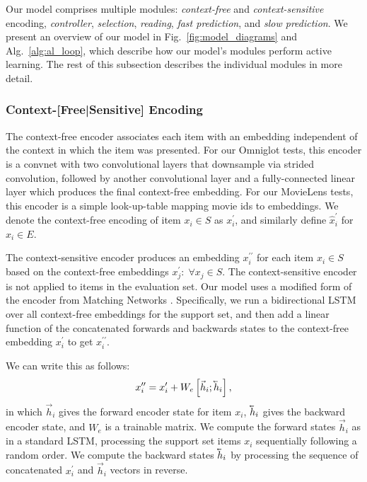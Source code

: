Our model comprises multiple modules: \emph{context-free} and \emph{context-sensitive} encoding, \emph{controller}, \emph{selection}, \emph{reading}, \emph{fast prediction}, and \emph{slow prediction}. We present an overview of our model in Fig.~\ref{fig:model_diagrams} and Alg.~\ref{alg:al_loop}, which describe how our model's modules perform active learning. The rest of this subsection describes the individual modules in more detail.



\subsubsection{Context-[Free|Sensitive] Encoding}
The context-free encoder associates each item with an embedding independent of the context in which the item was presented. For our Omniglot tests, this encoder is a convnet with two convolutional layers that downsample via strided convolution, followed by another convolutional layer and a fully-connected linear layer which produces the final context-free embedding. For our MovieLens tests, this encoder is a simple look-up-table mapping movie ids to embeddings. We denote the context-free encoding of item $x_i \in S$ as $x^{\prime}_i$, and similarly define $\hat{x}^{\prime}_i$ for $\hat{x}_i \in E$.

The context-sensitive encoder produces an embedding $x_i^{\prime\prime}$ for each item $x_i \in S$ based on the context-free embeddings $x_j^{\prime}: \; \forall x_j \in S$. The context-sensitive encoder is not applied to items in the evaluation set. Our model uses a modified form of the encoder from Matching Networks \cite{vinyals2016matching}. Specifically, we run a bidirectional LSTM \cite{hochreiter1997, Schuster1997} over all context-free embeddings for the support set, and then add a linear function of the concatenated forwards and backwards states to the context-free embedding $x_i^{\prime}$ to get $x_i^{\prime\prime}$.

We can write this as follows:
\begin{equation}
x_i^{\prime\prime} = x_i^{\prime} + W_{e} \left[ \vec{h}_i; \cev{h}_i \right],
\end{equation}
in which $\vec{h}_i$ gives the forward encoder state for item $x_i$, $\cev{h}_i$ gives the backward encoder state, and $W_{e}$ is a trainable matrix. We compute the forward states $\vec{h}_i$ as in a standard LSTM, processing the support set items $x_i$ sequentially following a random order. We compute the backward states $\cev{h}_i$ by processing the sequence of concatenated $x_i^{\prime}$ and $\vec{h}_i$ vectors in reverse.

